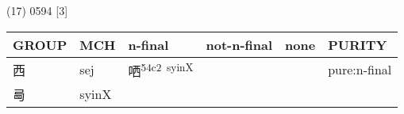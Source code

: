 \documentclass[14pt,a4paper]{scrartcl}
\begin{document}
(17) 0594 {[}3{]}

\begin{longtable}[c]{@{}llllll@{}}
\toprule
\begin{minipage}[b]{0.14\columnwidth}\raggedright\strut
GROUP
\strut\end{minipage} &
\begin{minipage}[b]{0.14\columnwidth}\raggedright\strut
MCH
\strut\end{minipage} &
\begin{minipage}[b]{0.14\columnwidth}\raggedright\strut
n-final
\strut\end{minipage} &
\begin{minipage}[b]{0.14\columnwidth}\raggedright\strut
not-n-final
\strut\end{minipage} &
\begin{minipage}[b]{0.14\columnwidth}\raggedright\strut
none
\strut\end{minipage} &
\begin{minipage}[b]{0.14\columnwidth}\raggedright\strut
PURITY
\strut\end{minipage}\tabularnewline
\midrule
\endhead
\begin{minipage}[t]{0.14\columnwidth}\raggedright\strut
西
\strut\end{minipage} &
\begin{minipage}[t]{0.14\columnwidth}\raggedright\strut
sej
\strut\end{minipage} &
\begin{minipage}[t]{0.14\columnwidth}\raggedright\strut
哂\textsuperscript{54c2~syinX}
\strut\end{minipage} &
\begin{minipage}[t]{0.14\columnwidth}\raggedright\strut
\strut\end{minipage} &
\begin{minipage}[t]{0.14\columnwidth}\raggedright\strut
\strut\end{minipage} &
\begin{minipage}[t]{0.14\columnwidth}\raggedright\strut
pure:n-final
\strut\end{minipage}\tabularnewline
\begin{minipage}[t]{0.14\columnwidth}\raggedright\strut
㢴
\strut\end{minipage} &
\begin{minipage}[t]{0.14\columnwidth}\raggedright\strut
syinX
\strut\end{minipage} &
\begin{minipage}[t]{0.14\columnwidth}\raggedright\strut

\end{minipage}
\end{longtable}
\end{document}
